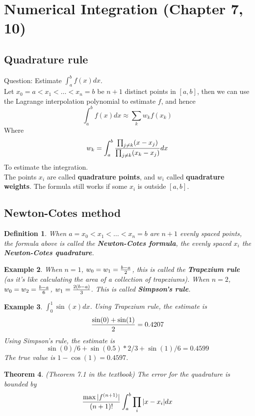 \documentclass{article} %
\theoremstyle{break}
\newtheorem{definition}{Definition}[section]
\newtheorem{exa}[definition]{Example}
\newtheorem{thm}[definition]{Theorem}
\begin{document}
\section{Numerical Integration (Chapter 7, 10)}

\subsection{Quadrature rule}

Question: Estimate $\int_a^bf(x)dx$.\\

Let $x_0=a<x_1<\dots<x_n=b$ be $n+1$ distinct points in $[a, b]$, then we can use the Lagrange interpolation polynomial to estimate $f$, and hence 
\[\int_a^b f(x)dx\approx \sum_kw_kf(x_k)\]
  Where
  \[w_k=\int_a^b {\prod_{j\not=k}(x-x_j)\over \prod_{j\not=k}(x_k-x_j)} dx\]
To estimate the integration.\\

The points $x_i$ are called {\bf quadrature points}, and $w_i$ called {\bf quadrature weights}. The formula still works if some $x_i$ is outside $[a, b]$.


\subsection{Newton-Cotes method}

\begin{definition} When $a=x_0<x_1<\dots<x_n=b$ are $n+1$ evenly spaced points, the formula above is called the {\bf Newton-Cotes formula}, the evenly spaced $x_i$ the {\bf Newton-Cotes quadrature}.
 \end{definition}

\begin{exa} When $n=1$, $w_0=w_1={b-a\over 2}$, this is called the {\bf Trapezium rule} (as it's like calculating the area of a collection of trapeziums). When $n=2$, $w_0=w_2={b-a\over 6}$, $w_1={2(b-a)\over 3}$. This is called {\bf Simpson's rule}.
\end{exa}

\begin{exa} $\int_0^1\sin(x)dx$. Using Trapezium rule, the estimate is
  \[{\sin(0)+\sin(1)\over 2}=0.4207\]
  Using Simpson's rule, the estimate is
  \[\sin(0)/6+\sin(0.5)*2/3+\sin(1)/6=0.4599\]
  The true value is $1-\cos(1)=0.4597$.
\end{exa}


\begin{thm} \label{bound1}(Theorem 7.1 in the textbook)
The error for the quadrature is bounded by
\[{\max|f^{(n+1)}|\over (n+1)!}\int_a^b\prod_i|x-x_i| dx\]
\end{thm}
\end{document}
